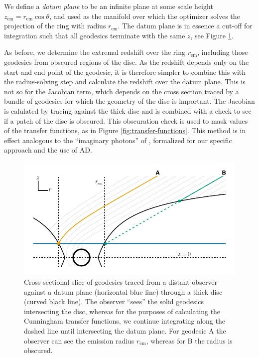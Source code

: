 \documentclass[fleqn,usenatbib]{mnras}
\newcommand{\rhoem}{r_\text{em}}
\begin{document}
We define a \emph{datum plane} to be an infinite plane at some scale height
$z_\text{em} = \rhoem \cos \theta$, and used as the manifold over which the
optimizer solves the projection of the ring with radius $\rhoem$. The datum
plane is in essence a cut-off for integration such that all geodesics terminate
with the same $z$, see Figure \ref{fig:datum-plane-tracing}.

As before, we determine the extremal redshift over the ring $\rhoem$, including
those geodesics from obscured regions of the disc. As the redshift depends only
on the start and end point of the geodesic, it is therefore simpler to combine
this with the radius-solving step and calculate the redshift over the datum
plane. This is not so for the Jacobian term, which depends on the cross section
traced by a bundle of geodesics for which the geometry of the disc is important.
The Jacobian is calulated by tracing against the thick disc and is combined with
a check to see if a patch of the disc is obscured. This obscuration check is
used to mask values of the transfer functions, as in Figure
\ref{fig:transfer-functions}. This method is in effect analogous to the
``imaginary photons'' of \cite{abdikamalov_testing_2020}, formalized for our
specific approach and the use of AD.

\begin{figure}
    \centering
    \includegraphics[width=0.95\linewidth]{figures/datum-plane.pdf}
    \caption{Cross-sectional slice of geodesics traced from a distant observer
        against a datum plane (horizontal blue line) through a thick disc
        (curved black line). The observer ``sees'' the solid geodesics
        intersecting the disc, whereas for the purposes of calculating the
        Cunningham transfer functions, we continue integrating along the dashed
        line until intersecting the datum plane. For geodesic A the observer
        can see the emission radius $\rhoem$, whereas for B the radius is
        obscured.
}
    \label{fig:datum-plane-tracing}
\end{figure}
\end{document}
